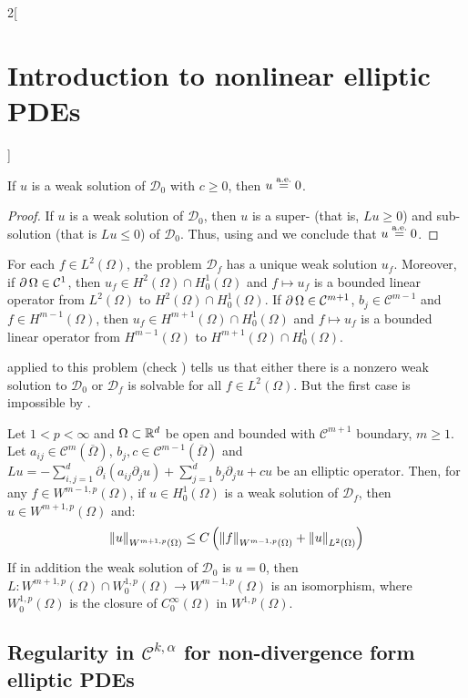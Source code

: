 \documentclass[../../../main_math.tex]{subfiles}
\begin{document}
\begin{multicols}{2}[\section{Introduction to nonlinear elliptic PDEs}]
\begin{corollary}
    If $u$ is a weak solution of $\mathcal{D}_0$ with $c\geq 0$, then $u\overset{\text{a.e.}}{=}0$.
  \end{corollary}
  \begin{proof}
    If $u$ is a weak solution of $\mathcal{D}_0$, then $u$ is a super- (that is, $Lu\geq 0$) and sub-solution (that is $Lu\leq 0$) of $\mathcal{D}_0$. Thus, using  and  we conclude that $u\overset{\text{a.e.}}{=}0$.
  \end{proof}
  \begin{corollary}
    For each $f\in L^2(\Omega)$, the problem $\mathcal{D}_f$ has a unique weak solution $u_f$. Moreover, if $\operatorname{\partial}{\Omega}\in\mathcal{C}^1$, then $u_f\in H^2(\Omega)\cap H_0^1(\Omega)$ and $f\mapsto u_f$ is a bounded linear operator from $L^2(\Omega)$ to $H^2(\Omega)\cap H_0^1(\Omega)$. If $\operatorname{\partial}{\Omega}\in\mathcal{C}^{m+1}$, $b_j\in\mathcal{C}^{m-1}$ and $f\in H^{m-1}(\Omega)$, then $u_f\in H^{m+1}(\Omega)\cap H_0^1(\Omega)$ and $f\mapsto u_f$ is a bounded linear operator from $H^{m-1}(\Omega)$ to $H^{m+1}(\Omega)\cap H_0^1(\Omega)$.
  \end{corollary}
  \begin{sproof}
     applied to this problem (check ) tells us that either there is a nonzero weak solution to $\mathcal{D}_0$ or $\mathcal{D}_f$ is solvable for all $f\in L^2(\Omega)$. But the first case is impossible by .
  \end{sproof}
  \begin{theorem}
    Let $1<p<\infty$ and $\Omega\subset\mathbb{R}^d$ be open and bounded with $\mathcal{C}^{m+1}$ boundary, $m\geq 1$. Let $a_{ij}\in \mathcal{C}^m(\overline{\Omega})$, $b_j,c\in \mathcal{C}^{m-1}(\overline{\Omega})$ and $Lu=-\sum_{i,j=1}^d \partial_i(a_{ij}\partial_j u)+\sum_{j=1}^d b_j\partial_j u+cu$ be an elliptic operator. Then, for any $f\in W^{m-1,p}(\Omega)$, if $u\in H^1_0(\Omega)$ is a weak solution of $\mathcal{D}_f$, then $u\in W^{m+1,p}(\Omega)$ and:
    $$
      \left\|u\right\|_{W^{m+1,p}(\Omega)}\leq C\left(\left\|f\right\|_{W^{m-1,p}(\Omega)}+\left\|u\right\|_{L^2(\Omega)}\right)
    $$
    If in addition the weak solution of $\mathcal{D}_0$ is $u=0$, then $L:W^{m+1,p}(\Omega)\cap W_0^{1,p}(\Omega)\to W^{m-1,p}(\Omega)$ is an isomorphism, where $W_0^{1,p}(\Omega)$ is the closure of $C_0^\infty(\Omega)$ in $W^{1,p}(\Omega)$.
  \end{theorem}
  \subsection{Regularity in \texorpdfstring{$\mathcal{C}^{k,\alpha}$}{Ckalpha} for non-divergence form elliptic PDEs}


\end{multicols}
\end{document}
